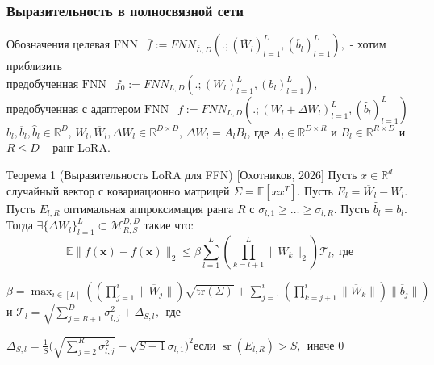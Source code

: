 \documentclass[10pt]{beamer}
\DeclareMathOperator{\sr}{sr}
\begin{document}
\begin{frame}
    \frametitle{Выразительность в полносвязной сети}
    \begin{block}{Обозначения}
        $\text{целевая FNN  }~~ \overline{f}:=FNN_{\overline{L},D}(.;(\overline{W}_l)_{l=1}^L, (\overline{b}_l)_{l=1}^L), $ - хотим приблизить \\
        $\text{предобученная FNN }~~ f_0:= FNN_{L,D}(.;(W_l)_{l=1}^L, (b_l)_{l=1}^L),$\\
        $\text{предобученная с адаптером FNN }~~ f:=FNN_{L,D}(.;(W_l + \Delta W_l)_{l=1}^L, (\hat{b}_l)_{l=1}^L)$\\
        $b_l, \overline{b}_l, \hat{b}_l \in \mathbb{R}^D$, $W_l, \overline{W}_l, \Delta W_l \in \mathbb{R}^{D\times D}$, $\Delta W_l = A_l B_l$, где $A_l\in \mathbb{R}^{D\times R}$ и $B_l\in \mathbb{R}^{R\times D}$ и $R\leqslant D$ -- ранг LoRA.
    \end{block}
    \begin{block}{Теорема 1 (Выразительность LoRA для FFN) [Охотников, 2026]}
        Пусть $x\in \mathbb{R}^d$ случайный вектор с ковариационно матрицей $\Sigma = \mathbb{E}[xx^T]$.
        Пусть $E_l = \overline{W}_l - W_l$. Пусть $E_{l,R}$ оптимальная аппроксимация ранга $R$ с $\sigma_{l,1} \geqslant \dots \geqslant \sigma_{l,R}$. Пусть $\hat{b}_l = \overline{b}_l$. Тогда  $\exists \{\Delta W_l\}_{l=1}^L \subset \mathcal{M}_{R,S}^{D,D}$ такие что:
        \vspace{-0.3cm}
        $$ \mathbb{E} \| f(\mathbf{x}) - \overline{f}(\mathbf{x}) \|_2 \leqslant \beta \sum_{l=1}^L \left( \prod_{k=l+1}^L \| \overline{W}_k \|_2 \right) \mathcal{T}_l, ~\text{где} $$
        \vspace{-0.3cm}

        $ \beta = \max_{i \in [L]} \left( \left( \prod_{j=1}^i \|\overline{W}_j\| \right) \sqrt{\text{tr}(\Sigma)} + \sum_{j=1}^i \left( \prod_{k=j+1}^i \|\overline{W}_k\| \right) \|\overline{b}_j\| \right) $\\
        и $ \mathcal{T}_l = \sqrt{ \sum_{j=R+1}^D \sigma_{l,j}^2 + \Delta_{S,l} }, ~~\text{где }$
        
        $\Delta_{S,l} = \frac{1}{S}\Big(\sqrt{\sum_{j=2}^R\sigma_{l,j}^2} - \sqrt{S-1}\sigma_{l,1}\Big)^2  \text{если } \sr(E_{l,R}) > S, ~~  \text{иначе } 0$
    \end{block}
\end{frame}
\end{document}

